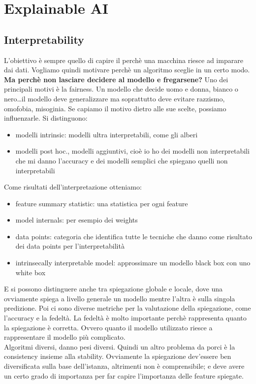 \section{Explainable AI}
\subsection{Interpretability}
L'obiettivo è sempre quello di capire il perchè una macchina riesce ad imparare dai dati. Vogliamo quindi motivare perchè un algoritmo sceglie in un certo modo. 
\\
\textbf{Ma perchè non lasciare decidere al modello e fregarsene?} Uno dei principali motivi è la fairness. Un modello che decide uomo e donna, bianco o nero\dots il modello deve generalizzare ma soprattutto deve evitare razzismo, omofobia, misoginia. Se capiamo il motivo dietro alle sue scelte, possiamo influenzarle. Si distinguono:
\begin{itemize}
    \item modelli intrinsic: modelli ultra interpretabili, come gli alberi
    \item modelli post hoc., modelli aggiuntivi, cioè io ho dei modelli non interpretabili che mi danno l'accuracy e dei modelli semplici che spiegano quelli non interpretabili 
\end{itemize}
Come risultati dell'interpretazione otteniamo:
\begin{itemize}
    \item feature summary statistic: una statistica per ogni feature
    \item model internals: per esempio dei weights
    \item data points: categoria che identifica tutte le tecniche che danno come risultato dei data points per l'interpretabilità
    \item intrinsecally interpretable model: approssimare un modello black box con uno white box
\end{itemize}
E si possono distinguere anche tra spiegazione globale e locale, dove una ovviamente spiega a livello generale un modello mentre l'altra è sulla singola predizione. Poi ci sono diverse metriche per la valutazione della spiegazione, come l'accuracy e la fedeltà. La fedeltà è molto importante perchè rappresenta quanto la spiegazione è corretta. Ovvero quanto il modello utilizzato riesce a rappresentare il modello più complicato.
\\
Algoritmi diversi, danno pesi diversi. Quindi un altro problema da porci è la consistency insieme alla stability. Ovviamente la spiegazione dev'essere ben diversificata sulla base dell'istanza, altrimenti non è comprensibile; e deve avere un certo grado di importanza per far capire l'importanza delle feature spiegate. 

